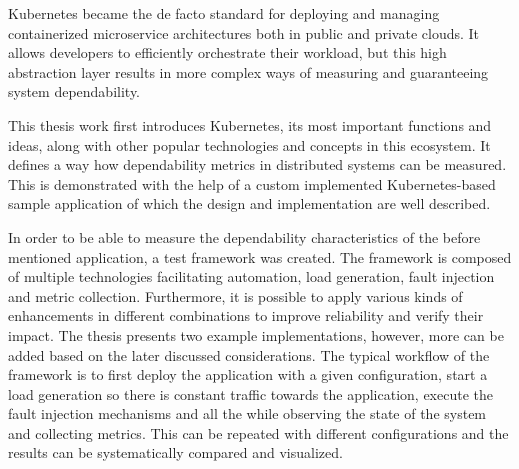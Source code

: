Kubernetes became the de facto standard for deploying and managing containerized microservice architectures both in public and private clouds. It allows developers to efficiently orchestrate their workload, but this high abstraction layer results in more complex ways of measuring and guaranteeing system dependability.

This thesis work first introduces Kubernetes, its most important functions and ideas, along with other popular technologies and concepts in this ecosystem. It defines a way how dependability metrics in distributed systems can be measured. This is demonstrated with the help of a custom implemented Kubernetes-based sample application of which the design and implementation are well described.

In order to be able to measure the dependability characteristics of the before mentioned application, a test framework was created. The framework is composed of multiple technologies facilitating automation, load generation, fault injection and  metric collection. Furthermore, it is possible to apply various kinds of enhancements in different combinations to improve reliability and verify their impact. The thesis presents two example implementations, however, more can be added based on the later discussed considerations. The typical workflow of the framework is to first deploy the application with a given configuration, start a load generation so there is constant traffic towards the application, execute the fault injection mechanisms and all the while observing the state of the system and collecting metrics. This can be repeated with different configurations and the results can be systematically compared and visualized.


\vfill
\selectthesislanguage

\setcounter{romanPage}{\value{page}}
